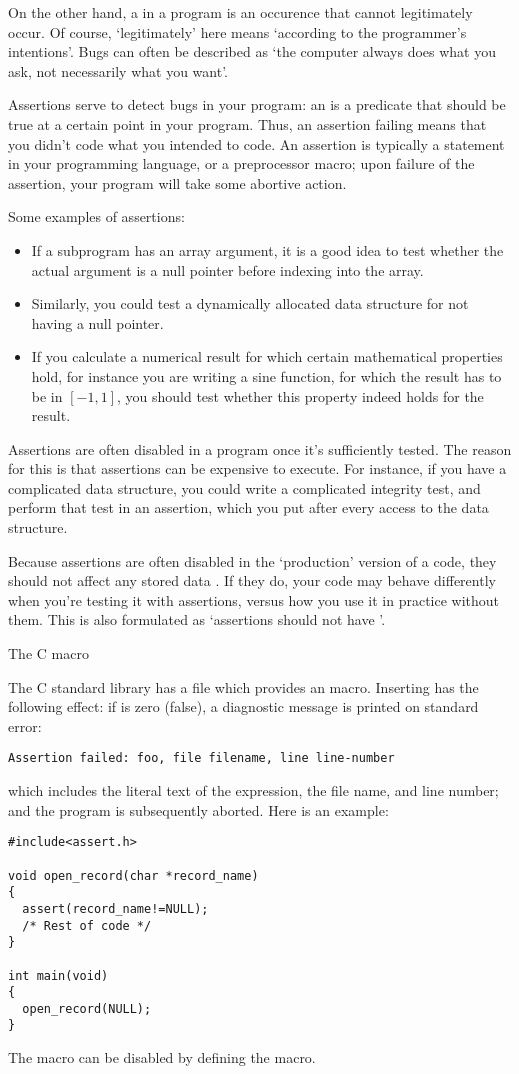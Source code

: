On the other hand, a  in a program is an occurence that cannot
legitimately occur. Of course, `legitimately' here means `according to
the programmer's intentions'. Bugs can often be described as `the computer
always does what you ask, not necessarily what you want'.

Assertions serve to detect bugs in your program: an 
is a predicate that should be true at a certain point in your program.
Thus, an assertion failing means that you didn't code what you intended to code.
An assertion is typically a statement in your programming language,
or a preprocessor macro; upon failure of the assertion, your program
will take some abortive action.

Some examples of assertions:
\begin{itemize}
\item If a subprogram has an array argument, it is a good idea to
  test whether the actual argument is a null pointer before indexing
  into the array.
\item Similarly, you could test a dynamically allocated data structure
  for not having a null pointer.
\item If you calculate a numerical result for which certain
  mathematical properties hold, for instance you are writing a sine function, for
  which the result has to be in $[-1,1]$, you should test whether this
  property indeed holds for the result.
\end{itemize}

Assertions are often disabled in a program once it's sufficiently tested.
The reason for this is that assertions can be expensive to execute.
For instance, 
if you have a complicated data structure, you could write a complicated
integrity test, and perform that test in an assertion, which you put
after every access to the data structure.

Because assertions are often disabled in the `production' version of a code,
they should not affect any stored data . If they do, your code may
behave differently when you're testing it with assertions, versus how you
use it in practice without them. This is also formulated as `assertions
should not have '.


 {The C \protect{} macro}

The C standard library has a file  which provides an
 macro. Inserting  has the following
effect: if  is zero (false), a diagnostic message is printed
on standard error:
\begin{verbatim}
Assertion failed: foo, file filename, line line-number
\end{verbatim}
which includes the literal text of the expression, 
the file name, and line number; and the program is subsequently
aborted. Here is an example:
\begin{verbatim}
#include<assert.h>

void open_record(char *record_name)
{
  assert(record_name!=NULL);
  /* Rest of code */
}

int main(void)
{
  open_record(NULL);
}
\end{verbatim}
The  macro can be disabled by defining the
 macro.

